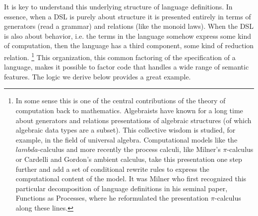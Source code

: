 It is key to understand this underlying structure of language
definitions. In essence, when a DSL is purely about structure it is
presented entirely in terms of generators (read a grammar) and
relations (like the monoid laws). When the DSL is also about behavior,
i.e. the terms in the language somehow express some kind of
computation, then the language has a third component, some kind of
reduction relation. \footnote{In some sense this is one of the central
  contributions of the theory of computation back to
  mathematics. Algebraists have known for a long time about generators
  and relations presentations of algebraic structures (of which
  algebraic data types are a subset). This collective wisdom is
  studied, for example, in the field of universal
  algebra. Computational models like the $lambda$-calculus and more
  recently the process calculi, like Milner's $\pi$-calculus or
  Cardelli and Gordon's ambient calculus, take this presentation one
  step further and add a set of conditional rewrite rules to express
  the computational content of the model. It was Milner who first
  recognized this particular decomposition of language definitions in
  his seminal paper, Functions as Processes, where he reformulated the
  presentation $\pi$-calculus along these lines.} This organization,
this common factoring of the specification of a language, makes it
possible to factor code that handles a wide range of semantic
features. The logic we derive below provides a great example.
